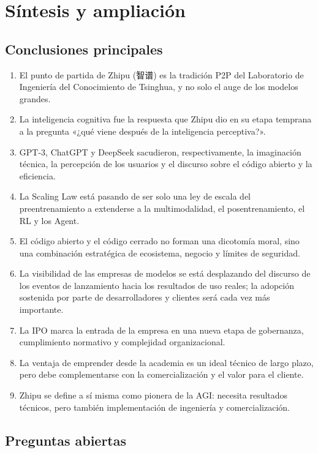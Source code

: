 \section{Síntesis y ampliación}

\subsection{Conclusiones principales}

\begin{enumerate}
\item El punto de partida de Zhipu (智谱) es la tradición P2P del Laboratorio de Ingeniería del Conocimiento de Tsinghua, y no solo el auge de los modelos grandes.
\item La inteligencia cognitiva fue la respuesta que Zhipu dio en su etapa temprana a la pregunta «¿qué viene después de la inteligencia perceptiva?».
\item GPT-3, ChatGPT y DeepSeek sacudieron, respectivamente, la imaginación técnica, la percepción de los usuarios y el discurso sobre el código abierto y la eficiencia.
\item La Scaling Law está pasando de ser solo una ley de escala del preentrenamiento a extenderse a la multimodalidad, el posentrenamiento, el RL y los Agent.
\item El código abierto y el código cerrado no forman una dicotomía moral, sino una combinación estratégica de ecosistema, negocio y límites de seguridad.
\item La visibilidad de las empresas de modelos se está desplazando del discurso de los eventos de lanzamiento hacia los resultados de uso reales; la adopción sostenida por parte de desarrolladores y clientes será cada vez más importante.
\item La IPO marca la entrada de la empresa en una nueva etapa de gobernanza, cumplimiento normativo y complejidad organizacional.
\item La ventaja de emprender desde la academia es un ideal técnico de largo plazo, pero debe complementarse con la comercialización y el valor para el cliente.
\item Zhipu se define a sí misma como pionera de la AGI: necesita resultados técnicos, pero también implementación de ingeniería y comercialización.
\end{enumerate}

\subsection{Preguntas abiertas}

